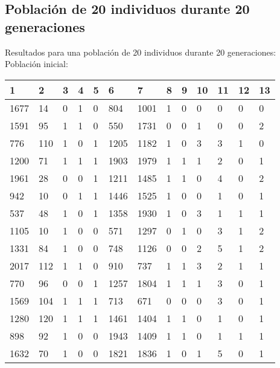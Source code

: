 \subsection{Población de 20 individuos durante 20 generaciones}
Resultados para una población de 20 individuos durante 20 generaciones:
Población inicial:
\begin{table}[H]
\begin{tabular}{|l|l|l|l|l|l|l|l|l|l|l|l|l|}
\hline
\textbf{1} & \textbf{2} & \textbf{3} & \textbf{4} & \textbf{5} & \textbf{6} & \textbf{7} & \textbf{8} & \textbf{9} & \textbf{10} & \textbf{11} & \textbf{12} & \textbf{13} \\ \hline
1677  &  14  &  0  &  1  &  0  &  804  &  1001  &  1  &  0  &  0  &  0  &  0  &  0 \\ \hline
1591  &  95  &  1  &  1  &  0  &  550  &  1731  &  0  &  0  &  1  &  0  &  0  &  2 \\ \hline
776  &  110  &  1  &  0  &  1  &  1205  &  1182  &  1  &  0  &  3  &  3  &  1  &  0 \\ \hline
1200  &  71  &  1  &  1  &  1  &  1903  &  1979  &  1  &  1  &  1  &  2  &  0  &  1 \\ \hline
1961  &  28  &  0  &  0  &  1  &  1211  &  1485  &  1  &  1  &  0  &  {\color[HTML]{FE0000}4}  &  0  &  2 \\ \hline
942  &  10  &  0  &  1  &  1  &  1446  &  1525  &  1  &  0  &  0  &  1  &  0  &  1 \\ \hline
537  &  48  &  1  &  0  &  1  &  1358  &  1930  &  1  &  0  &  3  &  1  &  1  &  1 \\ \hline
1105  &  10  &  1  &  0  &  0  &  571  &  1297  &  0  &  1  &  0  &  3  &  1  &  2 \\ \hline
1331  &  84  &  1  &  0  &  0  &  748  &  1126  &  0  &  0  &  2  &  {\color[HTML]{FE0000}5}  &  1  &  2 \\ \hline
2017  &  112  &  1  &  1  &  0  &  910  &  737  &  1  &  1  &  3  &  2  &  1  &  1 \\ \hline
770  &  96  &  0  &  0  &  1  &  1257  &  1804  &  1  &  1  &  1  &  3  &  0  &  1 \\ \hline
1569  &  104  &  1  &  1  &  1  &  713  &  671  &  0  &  0  &  0  &  3  &  0  &  1 \\ \hline
1280  &  120  &  1  &  1  &  1  &  1461  &  1404  &  1  &  1  &  0  &  1  &  0  &  1 \\ \hline
898  &  92  &  1  &  0  &  0  &  1943  &  1409  &  1  &  1  &  0  &  1  &  1  &  1 \\ \hline
1632  &  70  &  1  &  0  &  0  &  1821  &  1836  &  1  &  0  &  1  &  {\color[HTML]{FE0000}5}  &  0  &  1 \\ \hline

\end{tabular}
\end{table}
